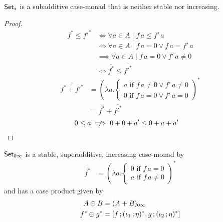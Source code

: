 \documentclass[runningheads,envcountsame]{llncs}
\begin{document}
\begin{lemma}
    $\mathsf{Set}_*$ is a subadditive case-monad that is neither stable nor increasing.
\end{lemma}
\begin{proof}
    \begin{align}
        f^* \leq f'^* &\iff \forall a \in A \mid f\,a \leq f'\,a \\
            &\iff \forall a \in A \mid f\,a = 0 \vee f\,a = f'\,a \\
            &\implies \forall a \in A \mid f\,a = 0 \vee f'\,a \neq 0 \\
            &\iff \overline{f^*} \leq \overline{f'^*}
    \end{align}
    \begin{align}
        \overline{f^* + f'^*} &= \left(\lambda a. \begin{cases}
            a \text{ if } f\,a \neq 0 \vee f'\,a \neq 0 \\
            0 \text{ if } f\,a = 0 \vee f'\,a = 0
        \end{cases}\right)^* \\
            &=\overline{f^*} + \overline{f'^*}
    \end{align}
    \begin{align}
        0 \leq a &\centernot\implies 0 + 0 + a' \leq 0 + a + a'
    \end{align}
\end{proof}
\begin{lemma}
    $\mathsf{Set}_{0\infty}$ is a stable, superadditive, increasing case-monad by 
    \begin{align}
        \overline{f^*} &= \left(\lambda a. \begin{cases}
            0 \text{ if } f\,a = 0 \\
            a \text{ if } f\,a \neq 0
        \end{cases}\right)^*
    \end{align}
    and has a case product given by
    \begin{align}
        A \oplus B &= (A + B)_{0\infty} \\
        f^* \oplus g^* &= [\comp{f}{(\comp{\iota_1}{\munit})^*}, \comp{g}{(\comp{\iota_2}{\munit})^*}]
    \end{align}
\end{lemma}
\end{document}
